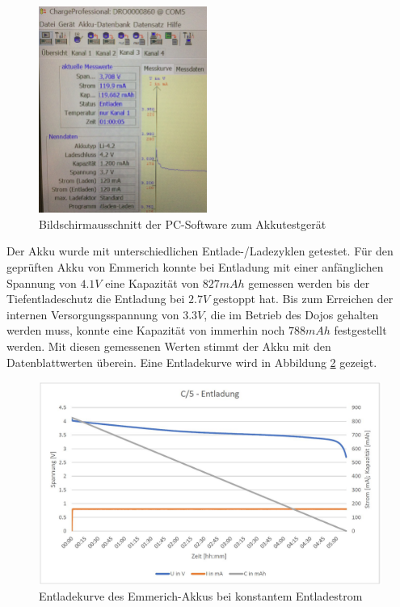 \begin{figure}[htp]
	\centering
	\includegraphics[width=5.5cm]{Bilder/ChargeProfessional.JPG}
	 \caption{Bildschirmausschnitt der PC-Software zum Akkutestgerät}
	 \label{fig:ChargeProfessional}
\end{figure}

Der Akku wurde mit unterschiedlichen Entlade-/Ladezyklen getestet. Für den geprüften Akku von Emmerich konnte bei Entladung mit einer anfänglichen Spannung von $4.1V$ eine Kapazität von $827mAh$ gemessen werden bis der Tiefentladeschutz die Entladung bei $2.7V$ gestoppt hat. Bis zum Erreichen der internen Versorgungsspannung von $3.3V$, die im Betrieb des Dojos gehalten werden muss, konnte eine Kapazität von immerhin noch $788mAh$ festgestellt werden. Mit diesen gemessenen Werten stimmt der Akku mit den Datenblattwerten überein. Eine Entladekurve wird in Abbildung \ref{fig:Entladekurve} gezeigt.\\

\begin{figure}[htp]
	\centering
	\includegraphics[width=15cm]{Bilder/Entladekurve.JPG}
	 \caption{Entladekurve des Emmerich-Akkus bei konstantem Entladestrom}
	 \label{fig:Entladekurve}
\end{figure}

